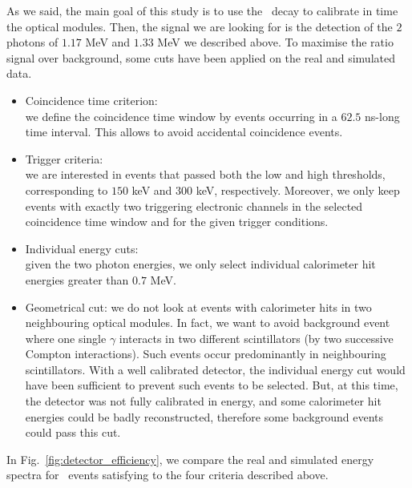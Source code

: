 As we said, the main goal of this study is to use the \Co\ decay to calibrate in time the optical modules.
Then, the signal we are looking for is the detection of the $2$ photons of $1.17$ MeV and $1.33$ MeV we described above.
To maximise the ratio signal over background, some cuts have been applied on the real and simulated data.
\begin{itemize}
\item Coincidence time criterion:\\ we define the coincidence time window by events occurring in a $62.5$ ns-long time interval.
  This allows to avoid accidental coincidence events.
\item Trigger criteria:\\ we are interested in events that passed both the low and high thresholds, corresponding to $150$ keV and $300$ keV, respectively.
  Moreover, we only keep events with exactly two triggering electronic channels in the selected coincidence time window and for the given trigger conditions.
\item Individual energy cuts:\\ given the two photon energies, we only select individual calorimeter hit energies greater than $0.7$ MeV.
\item Geometrical cut: we do not look at events with calorimeter hits in two neighbouring optical modules.
  In fact, we want to avoid background event where one single $\gamma$ interacts in two different scintillators (by two successive Compton interactions).
  Such events occur predominantly in neighbouring scintillators.
  With a well calibrated detector, the individual energy cut would have been sufficient to prevent such events to be selected.
  But, at this time, the detector was not fully calibrated in energy, and some calorimeter hit energies could be badly reconstructed, therefore some background events could pass this cut.
\end{itemize}
In Fig.~\ref{fig:detector_efficiency}, we compare the real and simulated energy spectra for \Co\ events satisfying to the four criteria described above.
